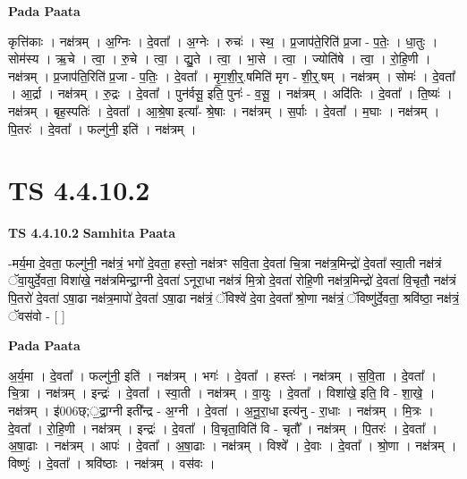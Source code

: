 \documentclass[17pt]{extarticle}
\begin{document}
\textbf{Pada Paata} \newline

कृत्ति॑काः । नक्ष॑त्रम् । अ॒ग्निः । दे॒वता᳚ । अ॒ग्नेः । रुचः॑ । स्थ॒ । प्र॒जाप॑ते॒रिति॑ प्र॒जा - प॒तेः॒ । धा॒तुः । सोम॑स्य । ऋ॒चे । त्वा॒ । रु॒चे । त्वा॒ । द्यु॒ते । त्वा॒ । भा॒से । त्वा॒ । ज्योति॑षे । त्वा॒ । रो॒हि॒णी । नक्ष॑त्रम् । प्र॒जाप॑ति॒रिति॑ प्र॒जा - प॒तिः॒ । दे॒वता᳚ । मृ॒ग॒शी॒र्॒.षमिति॑ मृग - शी॒र्॒.षम् । नक्ष॑त्रम् । सोमः॑ । दे॒वता᳚ । आ॒र्द्रा । नक्ष॑त्रम् । रु॒द्रः । दे॒वता᳚ । पुन॑र्वसू॒ इति॒ पुनः॑ - व॒सू॒ । नक्ष॑त्रम् । अदि॑तिः । दे॒वता᳚ । ति॒ष्यः॑ । नक्ष॑त्रम् । बृह॒स्पतिः॑ । दे॒वता᳚ । आ॒श्रे॒षा इत्या᳚- श्रे॒षाः । नक्ष॑त्रम् । स॒र्पाः । दे॒वता᳚ । म॒घाः । नक्ष॑त्रम् । पि॒तरः॑ । दे॒वता᳚ । फल्गु॑नी॒ इति॑ । नक्ष॑त्रम् ।  \newline





\section{ TS 4.4.10.2 }

\textbf{TS 4.4.10.2 } \newline
\textbf{Samhita Paata} \newline

-मर्य॒मा दे॒वता॒ फल्गु॑नी॒ नक्ष॑त्रं॒ भगो॑ दे॒वता॒ हस्तो॒ नक्ष॑त्रꣳ सवि॒ता दे॒वता॑ चि॒त्रा नक्ष॑त्र॒मिन्द्रो॑ दे॒वता᳚ स्वा॒ती नक्ष॑त्रं ॅवा॒युर्दे॒वता॒ विशा॑खे॒ नक्ष॑त्रमिन्द्रा॒ग्नी दे॒वता॑ ऽनूरा॒धा नक्ष॑त्रं मि॒त्रो दे॒वता॑ रोहि॒णी नक्ष॑त्र॒मिन्द्रो॑ दे॒वता॑ वि॒चृतौ॒ नक्ष॑त्रं पि॒तरो॑ दे॒वता॑ ऽषा॒ढा नक्ष॑त्र॒मापो॑ दे॒वता॑ ऽषा॒ढा नक्ष॑त्रं॒ ॅविश्वे॑ दे॒वा दे॒वता᳚ श्रो॒णा नक्ष॑त्रं॒ ॅविष्णु॑र्दे॒वता॒ श्रवि॑ष्ठा॒ नक्ष॑त्रं॒ ॅवस॑वो - [  ] \newline

\textbf{Pada Paata} \newline

अ॒र्य॒मा । दे॒वता᳚ । फल्गु॑नी॒ इति॑ । नक्ष॑त्रम् । भगः॑ । दे॒वता᳚ । हस्तः॑ । नक्ष॑त्रम् । स॒वि॒ता । दे॒वता᳚ । चि॒त्रा । नक्ष॑त्रम् । इन्द्रः॑ । दे॒वता᳚ । स्वा॒ती । नक्ष॑त्रम् । वा॒युः । दे॒वता᳚ । विशा॑खे॒ इति॒ वि - शा॒खे॒ । नक्ष॑त्रम् । इ॑006छ्;॒द्रा॒ग्नी इती᳚न्द्र - अ॒ग्नी । दे॒वता॑ । अ॒नू॒रा॒धा इत्य॑नु - रा॒धाः । नक्ष॑त्रम् । मि॒त्रः । दे॒वता᳚ । रो॒हि॒णी । नक्ष॑त्रम् । इन्द्रः॑ । दे॒वता᳚ । वि॒चृता॒विति॑ वि - चृतौ᳚ । नक्ष॑त्रम् । पि॒तरः॑ । दे॒वता᳚ । अ॒षा॒ढाः । नक्ष॑त्रम् । आपः॑ । दे॒वता᳚ । अ॒षा॒ढाः । नक्ष॑त्रम् । विश्वे᳚ । दे॒वाः । दे॒वता᳚ । श्रो॒णा । नक्ष॑त्रम् । विष्णुः॑ । दे॒वता᳚ । श्रवि॑ष्ठाः । नक्ष॑त्रम् । वस॑वः ।  \newline
\end{document}
